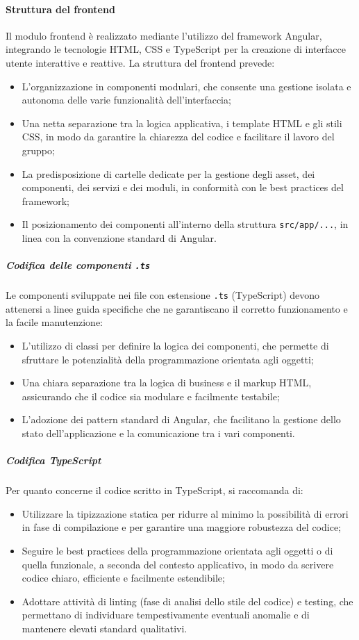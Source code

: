 \paragraph{Struttura del frontend}
Il modulo frontend è realizzato mediante l'utilizzo del framework Angular, integrando le tecnologie HTML, CSS e TypeScript per la creazione di interfacce utente interattive e reattive. La struttura del frontend prevede:
\begin{itemize}
    \item L'organizzazione in componenti modulari, che consente una gestione isolata e autonoma delle varie funzionalità dell'interfaccia;
    \item Una netta separazione tra la logica applicativa, i template HTML e gli stili CSS, in modo da garantire la chiarezza del codice e facilitare il lavoro del gruppo;
    \item La predisposizione di cartelle dedicate per la gestione degli asset, dei componenti, dei servizi e dei moduli, in conformità con le best practices del framework;
    \item Il posizionamento dei componenti all'interno della struttura \texttt{src/app/...}, in linea con la convenzione standard di Angular.
\end{itemize}

\subparagraph{Codifica delle componenti \texttt{.ts}}
Le componenti sviluppate nei file con estensione \texttt{.ts} (TypeScript) devono attenersi a linee guida specifiche che ne garantiscano il corretto funzionamento e la facile manutenzione:
\begin{itemize}
    \item L'utilizzo di classi per definire la logica dei componenti, che permette di sfruttare le potenzialità della programmazione orientata agli oggetti;
    \item Una chiara separazione tra la logica di business e il markup HTML, assicurando che il codice sia modulare e facilmente testabile;
    \item L'adozione dei pattern standard di Angular, che facilitano la gestione dello stato dell'applicazione e la comunicazione tra i vari componenti.
\end{itemize}

\subparagraph{Codifica TypeScript}
Per quanto concerne il codice scritto in TypeScript, si raccomanda di:
\begin{itemize}
    \item Utilizzare la tipizzazione statica per ridurre al minimo la possibilità di errori in fase di compilazione e per garantire una maggiore robustezza del codice;
    \item Seguire le best practices della programmazione orientata agli oggetti o di quella funzionale, a seconda del contesto applicativo, in modo da scrivere codice chiaro, efficiente e facilmente estendibile;
    \item Adottare attività di linting (fase di analisi dello stile del codice) e testing, che permettano di individuare tempestivamente eventuali anomalie e di mantenere elevati standard qualitativi.
\end{itemize}

